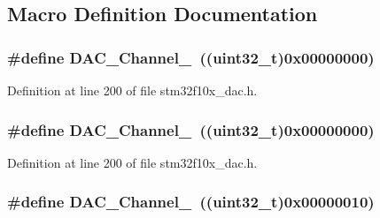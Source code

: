 \subsection{Macro Definition Documentation}
\subsubsection[{\texorpdfstring{D\+A\+C\+\_\+\+Channel\+\_\+1}{DAC_Channel_1}}]{\setlength{\rightskip}{0pt plus 5cm}\#define D\+A\+C\+\_\+\+Channel\+\_~(({\bf uint32\+\_\+t})0x00000000)}\hypertarget{group___d_a_c___channel__selection_gacf6585474ed2a302b69a3725daa91555}{}\label{group___d_a_c___channel__selection_gacf6585474ed2a302b69a3725daa91555}


Definition at line 200 of file stm32f10x\+\_\+dac.\+h.

\subsubsection[{\texorpdfstring{D\+A\+C\+\_\+\+Channel\+\_\+1}{DAC_Channel_1}}]{\setlength{\rightskip}{0pt plus 5cm}\#define D\+A\+C\+\_\+\+Channel\+\_~(({\bf uint32\+\_\+t})0x00000000)}\hypertarget{group___d_a_c___channel__selection_gacf6585474ed2a302b69a3725daa91555}{}\label{group___d_a_c___channel__selection_gacf6585474ed2a302b69a3725daa91555}


Definition at line 200 of file stm32f10x\+\_\+dac.\+h.

\subsubsection[{\texorpdfstring{D\+A\+C\+\_\+\+Channel\+\_\+2}{DAC_Channel_2}}]{\setlength{\rightskip}{0pt plus 5cm}\#define D\+A\+C\+\_\+\+Channel\+\_~(({\bf uint32\+\_\+t})0x00000010)}\hypertarget{group___d_a_c___channel__selection_ga0e9b0096866bb06e8a82b3e4e66943bb}{}\label{group___d_a_c___channel__selection_ga0e9b0096866bb06e8a82b3e4e66943bb}


